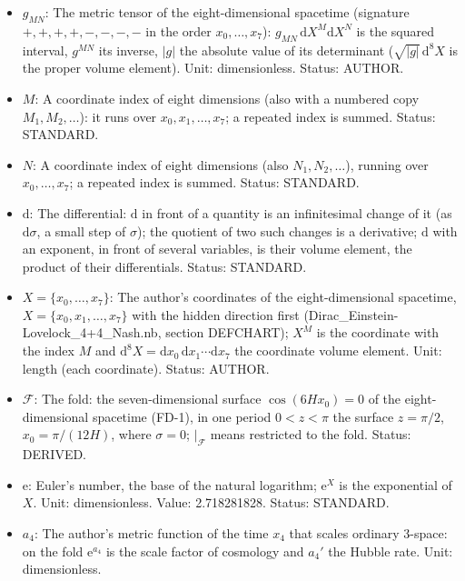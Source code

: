 \documentclass[
  10pt,
]{article}
\providecommand{\tightlist}{%
  \setlength{\itemsep}{0pt}\setlength{\parskip}{0pt}}
\begin{document}
\begin{itemize}
\tightlist
\item
  \(g_{MN}\): The metric tensor of the eight-dimensional spacetime
  (signature \(+,+,+,+,-,-,-,-\) in the order \(x_0, \dots, x_7\)):
  \(g_{MN}\,\mathrm{d}X^M\mathrm{d}X^N\) is the squared interval,
  \(g^{MN}\) its inverse, \(\lvert g\rvert\) the absolute value of its
  determinant (\(\sqrt{\lvert g\rvert}\,\mathrm{d}^8X\) is the proper
  volume element). Unit: dimensionless. Status: AUTHOR.
\item
  \(M\): A coordinate index of eight dimensions (also with a numbered
  copy \(M_1, M_2, \dots\)): it runs over \(x_0, x_1, \dots, x_7\); a
  repeated index is summed. Status: STANDARD.
\item
  \(N\): A coordinate index of eight dimensions (also
  \(N_1, N_2, \dots\)), running over \(x_0, \dots, x_7\); a repeated
  index is summed. Status: STANDARD.
\item
  \(\mathrm{d}\): The differential: \(\mathrm{d}\) in front of a
  quantity is an infinitesimal change of it (as \(\mathrm{d}\sigma\), a
  small step of \(\sigma\)); the quotient of two such changes is a
  derivative; \(\mathrm{d}\) with an exponent, in front of several
  variables, is their volume element, the product of their
  differentials. Status: STANDARD.
\item
  \(X = \{x_0, \dots, x_7\}\): The author's coordinates of the
  eight-dimensional spacetime, \(X = \{x_0, x_1, \dots, x_7\}\) with the
  hidden direction first (Dirac\_Einstein-Lovelock\_4+4\_Nash.nb,
  section DEFCHART); \(X^M\) is the coordinate with the index \(M\) and
  \(\mathrm{d}^8X = \mathrm{d}x_0\,\mathrm{d}x_1\cdots\mathrm{d}x_7\)
  the coordinate volume element. Unit: length (each coordinate). Status:
  AUTHOR.
\item
  \(\mathcal{F}\): The fold: the seven-dimensional surface
  \(\cos(6Hx_0) = 0\) of the eight-dimensional spacetime (FD-1), in one
  period \(0 < z < \pi\) the surface \(z = \pi/2\), \(x_0 = \pi/(12H)\),
  where \(\sigma = 0\); \(\vert_{\mathcal{F}}\) means restricted to the
  fold. Status: DERIVED.
\item
  \(\mathrm{e}\): Euler's number, the base of the natural logarithm;
  \(\mathrm{e}^{X}\) is the exponential of \(X\). Unit: dimensionless.
  Value: 2.718281828. Status: STANDARD.
\item
  \(a_4\): The author's metric function of the time \(x_4\) that scales
  ordinary 3-space: on the fold \(\mathrm{e}^{a_4}\) is the scale factor
  of cosmology and \(a_4'\) the Hubble rate. Unit: dimensionless.

\end{itemize}
\end{document}

